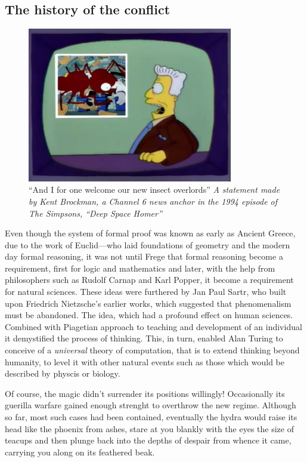 \documentclass[11pt]{article}
\begin{document}
\subsection{The history of the conflict}
\label{sec-1-1}

\begin{figure}[h!]
  \centering
  \includegraphics[width=0.8\textwidth]{./insect-overlords.png}
  \caption[Welcome insect overlords]{
    \ssmall ``And I for one welcome our new insect overlords''
    \textit{A statement made by Kent Brockman, a Channel 6 news anchor in
      the 1994 episode of The Simpsons, ``Deep Space Homer''}}
\end{figure}

Even though the system of formal proof was known as early as Ancient Greece,
due to the work of Euclid---who laid foundations of geometry and the modern
day formal reasoning, it was not until Frege that formal reasoning become a
requirement, first for logic and mathematics and later, with the help from
philosophers such as Rudolf Carnap and Karl Popper, it become a requirement
for natural sciences.  These ideas were furthered by Jan Paul Sartr, who
built upon Friedrich Nietzsche's earlier works, which suggested that
phenomenalism must be abandoned.  The idea, which had a profound effect on
human sciences.  Combined with Piagetian approach to teaching and development
of an individual it demystified the process of thinking.  This, in turn,
enabled Alan Turing to conceive of a \emph{universal} theory of computation, that
is to extend thinking beyond humanity, to level it with other natural events
such as those which would be described by physcis or biology.

Of course, the magic didn't surrender its positions willingly! Occasionally
its guerilla warfare gained enough strenght to overthrow the new regime.
Although so far, most such cases had been contained, eventually the hydra
would raise its head like the phoenix from ashes, stare at you blankly with
the eyes the size of teacups and then plunge back into the depths of despair
from whence it came, carrying you along on its feathered beak.
\end{document}
